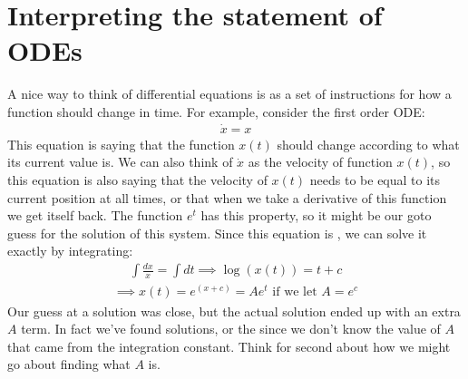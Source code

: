 \documentclass[letterpaper,10pt,english]{jupyterBook}
\begin{document}
\section{Interpreting the statement of ODEs}
\label{\detokenize{content/1_mechanics/mechanics_intro:interpreting-the-statement-of-odes}}
\sphinxAtStartPar
A nice way to think of differential equations is as a set of instructions for how a function should change in time. For example, consider the first order ODE:
\begin{equation*}
\begin{split}
\dot{x} = x
\end{split}
\end{equation*}
\sphinxAtStartPar
This equation is saying that the function \(x(t)\) should change according to what its current value is. We can also think of \(\dot{x}\) as the velocity of function \(x(t)\), so this equation is also saying that the velocity of \(x(t)\) needs to be equal to its current position at all times, or that when we take a derivative of this function we get itself back. The function \(e^t\) has this property, so it might be our go\sphinxhyphen{}to guess for the solution of this system. Since this equation is , we can solve it exactly by integrating:
\begin{equation*}
\begin{split}
\int \frac{dx}{x} = \int dt \implies \log(x(t)) = t + c
\end{split}
\end{equation*}\begin{equation*}
\begin{split}
\implies x(t) = e^{(x + c)} = Ae^t \text{ if we let } A = e^c
\end{split}
\end{equation*}
\sphinxAtStartPar
Our guess at a solution was close, but the actual solution ended up with an extra \(A\) term. In fact we’ve found  solutions, or the  since we don’t know the value of \(A\) that came from the integration constant.  Think for second about how we might go about finding what \(A\) is.
\end{document}
